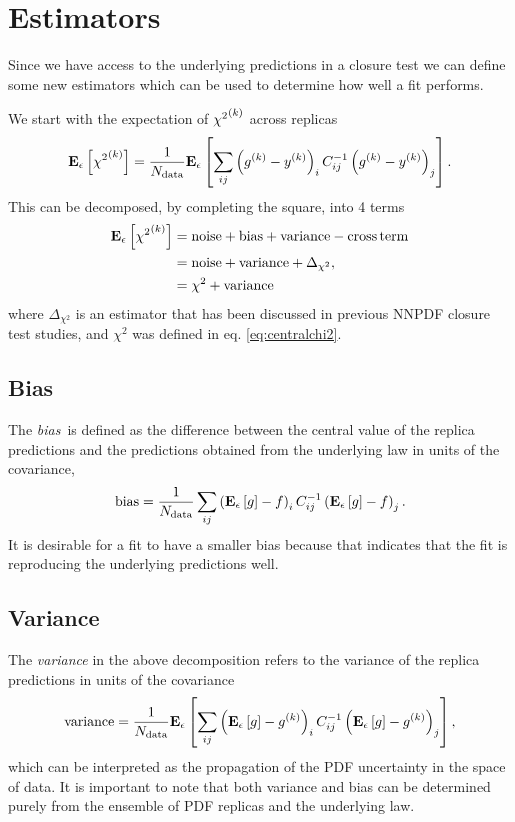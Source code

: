 \section{Estimators}
Since we have access to the underlying predictions in a closure test we can
define some new estimators which can be used to determine how well a fit
performs.

We start with the expectation of ${\chi^2}^{(k)}$ across replicas
\begin{equation}
    \label{eq:chi2kerep}
    \mathbf{E}_{\epsilon}\left[ {\chi^2}^{(k)} \right] = \frac{1}{N_{\rm data}} 
    \mathbf{E}_{\epsilon}\left[  \sum_{ij} \left( g^{(k)} - y^{(k)} \right)_i C^{-1}_{ij} \left( g^{(k)} - y^{(k)} \right)_j \right].
\end{equation}
This can be decomposed, by completing the square, into 4 terms
\begin{equation}
    \label{eq:chi2decomp}
    \begin{split}
        \mathbf{E}_{\epsilon}\left[ {\chi^2}^{(k)} \right] &= {\rm noise} + {\rm bias} + {\rm variance} - {\rm cross\,term} \\
        &=  {\rm noise} + {\rm variance} + \Delta_{\chi^2}, \\
        &= \chi^2 + {\rm variance}
    \end{split}
\end{equation}
where $\Delta_{\chi^2}$ is an estimator that has been discussed in previous
NNPDF closure test studies, and $\chi^2$ was defined in eq.
\eqref{eq:centralchi2}.

\subsection{Bias}

The {\em bias}\ is defined as the difference between the central value of the
replica predictions and the predictions obtained from the underlying law in
units of the covariance, \ie 
\begin{equation}
    \label{eq:BiasDef}
    {\rm bias} = \frac{1}{N_{\rm data}} \sum_{ij} \left( \mathbf{E}_{\epsilon}\left[ g \right] - f \right)_i C^{-1}_{ij} \left( \mathbf{E}_{\epsilon}\left[ g \right] - f \right)_j.
\end{equation}
It is desirable for a fit to have a smaller bias because that indicates
that the fit is reproducing the underlying predictions well.

\subsection{Variance}

The {\em variance} in the above decomposition refers to the variance of the
replica predictions in units of the covariance
\begin{equation}
    \label{eq:VarDef}
    {\rm variance} = \frac{1}{N_{\rm data}} \mathbf{E}_{\epsilon}\left[  \sum_{ij} \left( \mathbf{E}_{\epsilon}\left[ g \right] - g^{(k)}\right)_{i} C^{-1}_{ij} \left( \mathbf{E}_{\epsilon}\left[ g \right] - g^{(k)}\right)_{j} \right],
\end{equation}
which can be interpreted as the propagation of the PDF uncertainty in the space
of data. It is important to note that both variance and bias can be determined
purely from the ensemble of PDF replicas and the underlying law.

